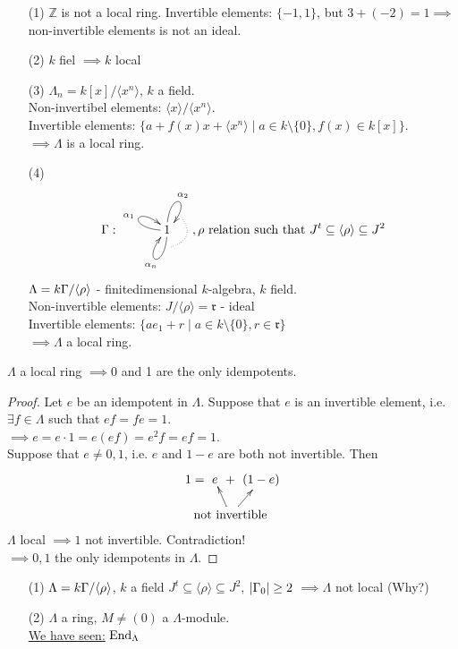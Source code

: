 \begin{exam}
\begin{enumerate}
\item[]
\item[(1)] $\mathbb{Z}$ is not a local ring. Invertible elements: $\{ -1, 1 \}$, but $3 + (-2) = 1 \implies 	$ non-invertible elements is not an ideal.
\item[(2)] $k$ fiel $\implies k$ local
\item[(3)] $\Lambda_n = k[x]/\langle x^n \rangle$, $k$ a field.\\
Non-invertibel elements: $\langle x \rangle / \langle x^n \rangle$.\\
Invertible elements: $\{ a + f(x)x + \langle x^n \rangle \mid  a \in k\setminus \{ 0 \}, f(x) \in k[x] \}$.\\
$\implies \Lambda$ is a local ring.
\item[(4)] $$\G : 
\vcenter{\xy\xymatrix{
1 \ar@(l,ul)^{\alpha_1} \ar@(u,ur)^{\alpha_2} \ar@(d,dl)^{\alpha_n}
}
\POS(3, 5)
\xymatrix"an"{{}}
\POS(0, -5)
\xymatrix"a2"{ \ar@{.}@/_1pc/["an"]}
\endxy
}, \rho \text{ relation such that } J^t \subseteq \langle \rho \rangle \subseteq J^2$$
$\Lambda = k\Gamma / \langle \rho \rangle$ - finitedimensional $k$-algebra, $k$ field.\\
Non-invertible elements: $J / \langle \rho \rangle = \mathfrak{r}$ - ideal\\
Invertible elements: $\{ ae_1 + r \mid a \in k \setminus \{ 0 \}, r \in \mathfrak{r} \}$\\
$\implies \Lambda$ a local ring.
\end{enumerate}
\end{exam}

\begin{prop}
$\Lambda$ a local ring $\implies 0$ and 1 are the only idempotents.
\begin{proof}
Let $e$ be an idempotent in $\Lambda$. Suppose that $e$ is an invertible element, i.e. $\exists f \in \Lambda$ such that $ef = fe = 1$.\\
$\implies e = e\cdot 1 = e(ef) = e^2f = ef = 1$.\\
Suppose that $e \neq 0,1$, i.e. $e$ and $1-e$ are both not invertible. Then \[\xy\xymatrix"eq"@C-2pc{1  = & e &+ & (1-e)}
\POS+(10, -10)
\xymatrix{\text{not invertible} \ar["eq"r] \ar["eq"rrr]}
\endxy\]
$\Lambda$ local $\implies 1$ not invertible. Contradiction!\\
$\implies 0,1$ the only idempotents in $\Lambda$.
\end{proof}
\end{prop}

\begin{note}
\begin{enumerate}
\item[(1)] $\Lambda = k\Gamma / \langle \rho \rangle$, $k$ a field $J^t \subseteq \langle \rho \rangle \subseteq J^2$, $|\Gamma_0| \geq 2$ $\implies \Lambda$ not local (Why?)
\item[(2)] $\Lambda$ a ring, $M \neq (0)$ a $\Lambda$-module.\\
\underline{We have seen:} $\operatorname{End}_\Lambda$
\end{enumerate}
\end{note}